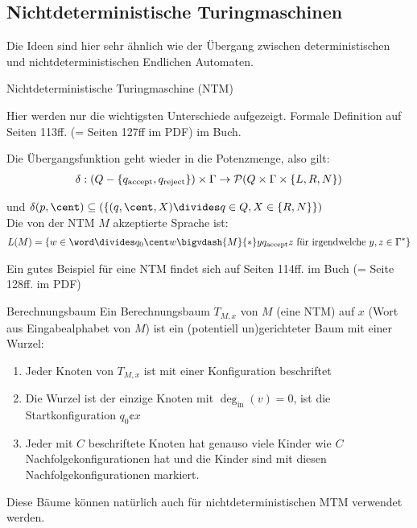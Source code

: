 \newpage
\subsection{Nichtdeterministische Turingmaschinen}
Die Ideen sind hier sehr ähnlich wie der Übergang zwischen deterministischen und nichtdeterministischen Endlichen Automaten.

\begin{definition}[]{Nichtdeterministische Turingmaschine (NTM)}
    \begin{scriptsize}
        Hier werden nur die wichtigsten Unterschiede aufgezeigt. Formale Definition auf Seiten 113ff. (= Seiten 127ff im PDF) im Buch.
    \end{scriptsize}

    Die Übergangsfunktion geht wieder in die Potenzmenge, also gilt:
    \rmvspace
    \begin{align*}
        \delta : (Q - \{ q_{\text{accept}}, q_{\text{reject}} \}) \times \Gamma \rightarrow \mathcal{P}(Q \times \Gamma \times \{ L, R, N \})
    \end{align*}

    \rmvspace
    und $\delta(p, \cent) \subseteq (\{ (q, \cent, X) \divides q \in Q, X \in \{R, N\} \})$\\

    Die von der NTM $M$ akzeptierte Sprache ist:
    \rmvspace
    \begin{align*}
        L(M) = \{ w \in \word \divides q_0\cent w \bigvdash{M}{*}y\qacc z \text{ für irgendwelche } y, z \in \Gamma^* \}
    \end{align*}
\end{definition}
Ein gutes Beispiel für eine NTM findet sich auf Seiten 114ff. im Buch (= Seite 128ff. im PDF)


\begin{definition}[]{Berechnungsbaum}
    Ein Berechnungsbaum $T_{M, x}$ von $M$ (eine NTM) auf $x$ (Wort aus Eingabealphabet von $M$) ist ein (potentiell un)gerichteter Baum mit einer Wurzel:
    \begin{enumerate}[label=\textit{(\roman*)}]
        \item Jeder Knoten von $T_{M, x}$ ist mit einer Konfiguration beschriftet
        \item Die Wurzel ist der einzige Knoten mit $\deg_{\text{in}}(v) = 0$, ist die Startkonfiguration $q_0\cent x$
        \item Jeder mit $C$ beschriftete Knoten hat genauso viele Kinder wie $C$ Nachfolgekonfigurationen hat und die Kinder sind mit diesen Nachfolgekonfigurationen markiert.
    \end{enumerate}
\end{definition}
Diese Bäume können natürlich auch für nichtdeterministischen MTM verwendet werden.

